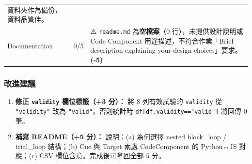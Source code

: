 \documentclass[14pt,]{extarticle}
\providecommand{\tightlist}{%
  \setlength{\itemsep}{0pt}\setlength{\parskip}{0pt}}
\begin{document}
\begin{longtable}[]{@{}lll@{}}
\begin{minipage}[t]{0.09\columnwidth}
資料夾作為備份，資料品質佳。\strut
\end{minipage}\tabularnewline
\begin{minipage}[t]{0.09\columnwidth}\raggedright
Documentation\strut
\end{minipage} & \begin{minipage}[t]{0.09\columnwidth}\raggedright
0/5\strut
\end{minipage} & \begin{minipage}[t]{0.09\columnwidth}\raggedright
⚠️ \texttt{readme.md} 為\textbf{空檔案}（0 行），未提供設計說明或 Code
Component 用途描述，不符合作業「Brief description explaining your design
choices」要求。\textbf{(-5)}\strut
\end{minipage}\tabularnewline
\bottomrule
\end{longtable}

\hypertarget{ux6539ux9032ux5efaux8b70}{%
\subsubsection{改進建議}\label{ux6539ux9032ux5efaux8b70}}

\begin{enumerate}
\def\labelenumi{\arabic{enumi}.}
\tightlist
\item
  \textbf{修正 \texttt{validity} 欄位標籤（+3 分）：} 將 8 列有效試驗的
  \texttt{validity} 從 \texttt{"validity"} 改為
  \texttt{"valid"}，否則統計時 \texttt{df{[}df.validity=="valid"{]}}
  將回傳 0 筆。
\item
  \textbf{補寫 README（+5 分）：} 說明：(a) 為何選擇 nested block\_loop
  / trial\_loop 結構；(b) Cue 與 Target 兩處 CodeComponent 的 Python↔JS
  對應；(c) CSV 欄位含意。完成後可拿回全部 5 分。
\end{enumerate}
\end{document}
